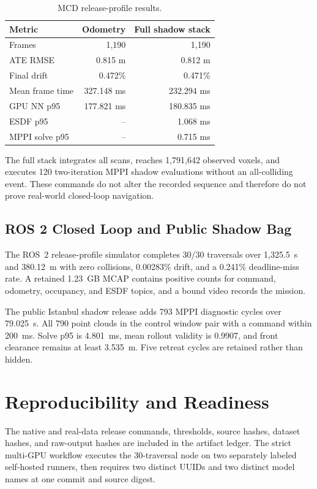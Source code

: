 \documentclass[conference]{IEEEtran}
\begin{document}
\begin{table}[t]
\centering
\caption{MCD release-profile results.}
\label{tab:mcd}
\small
\begin{tabular}{lrr}
\toprule
Metric & Odometry & Full shadow stack \\
\midrule
Frames & 1,190 & 1,190 \\
ATE RMSE & 0.815 m & 0.812 m \\
Final drift & 0.472\% & 0.471\% \\
Mean frame time & 327.148 ms & 232.294 ms \\
GPU NN p95 & 177.821 ms & 180.835 ms \\
ESDF p95 & -- & 1.068 ms \\
MPPI solve p95 & -- & 0.715 ms \\
\bottomrule
\end{tabular}
\end{table}
The full stack integrates all scans, reaches 1,791,642 observed voxels, and
executes 120 two-iteration MPPI shadow evaluations without an all-colliding
event. These commands do not alter the recorded sequence and therefore do not
prove real-world closed-loop navigation.

\subsection{ROS 2 Closed Loop and Public Shadow Bag}
The ROS~2 release-profile simulator completes 30/30 traversals over
1,325.5~s and 380.12~m with zero collisions, 0.00283\% drift, and a 0.241\%
deadline-miss rate. A retained 1.23~GB MCAP contains positive counts for
command, odometry, occupancy, and ESDF topics, and a bound video records the
mission.

The public Istanbul shadow release adds 793 MPPI diagnostic cycles over
79.025~s. All 790 point clouds in the control window pair with a command
within 200~ms. Solve p95 is 4.801~ms, mean rollout validity is 0.9907, and
front clearance remains at least 3.535~m. Five retreat cycles are retained
rather than hidden.

\section{Reproducibility and Readiness}
The native and real-data release commands, thresholds, source hashes, dataset
hashes, and raw-output hashes are included in the artifact ledger. The strict
multi-GPU workflow executes the 30-traversal node on two separately labeled
self-hosted runners, then requires two distinct UUIDs and two distinct model
names at one commit and source digest.
\end{document}
